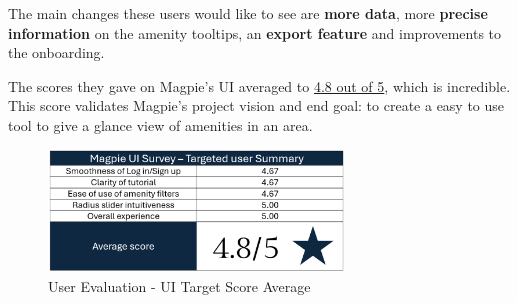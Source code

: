 The main changes these users would like to see are \textbf{more data}, more
\textbf{precise information} on the amenity tooltips, an \textbf{export feature}
and improvements to the onboarding.

The scores they gave on Magpie's UI averaged to \underline{4.8 out of 5}, which
is incredible. This score validates Magpie's project vision and end goal: to
create a easy to use tool to give a glance view of amenities in an area.
\begin{figure}[h!]
    \centering
    \includegraphics[width=0.7\textwidth]{images/survey-target-summary.png}
    \caption{User Evaluation - UI Target Score Average}
\end{figure}
